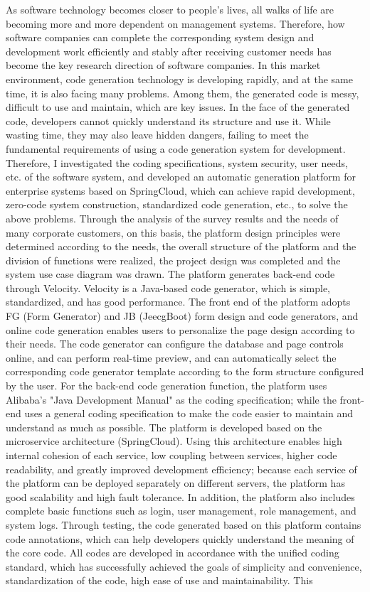 \documentclass{izdthesis}
\begin{document}
\begin{enabstract}
As software technology becomes closer to people's lives, all walks of life are becoming more and more dependent on management systems. Therefore, how software companies can complete the corresponding system design and development work efficiently and stably after receiving customer needs has become the key research direction of software companies. In this market environment, code generation technology is developing rapidly, and at the same time, it is also facing many problems. Among them, the generated code is messy, difficult to use and maintain, which are key issues. In the face of the generated code, developers cannot quickly understand its structure and use it. While wasting time, they may also leave hidden dangers, failing to meet the fundamental requirements of using a code generation system for development. Therefore, I investigated the coding specifications, system security, user needs, etc. of the software system, and developed an automatic generation platform for enterprise systems based on SpringCloud, which can achieve rapid development, zero-code system construction, standardized code generation, etc., to solve the above problems. Through the analysis of the survey results and the needs of many corporate customers, on this basis, the platform design principles were determined according to the needs, the overall structure of the platform and the division of functions were realized, the project design was completed and the system use case diagram was drawn. The platform generates back-end code through Velocity. Velocity is a Java-based code generator, which is simple, standardized, and has good performance. The front end of the platform adopts FG (Form Generator) and JB (JeecgBoot) form design and code generators, and online code generation enables users to personalize the page design according to their needs. The code generator can configure the database and page controls online, and can perform real-time preview, and can automatically select the corresponding code generator template according to the form structure configured by the user. For the back-end code generation function, the platform uses Alibaba's "Java Development Manual" as the coding specification; while the front-end uses a general coding specification to make the code easier to maintain and understand as much as possible. The platform is developed based on the microservice architecture (SpringCloud). Using this architecture enables high internal cohesion of each service, low coupling between services, higher code readability, and greatly improved development efficiency; because each service of the platform can be deployed separately on different servers, the platform has good scalability and high fault tolerance. In addition, the platform also includes complete basic functions such as login, user management, role management, and system logs. Through testing, the code generated based on this platform contains code annotations, which can help developers quickly understand the meaning of the core code. All codes are developed in accordance with the unified coding standard, which has successfully achieved the goals of simplicity and convenience, standardization of the code, high ease of use and maintainability. This 
\end{enabstract}
\end{document}
